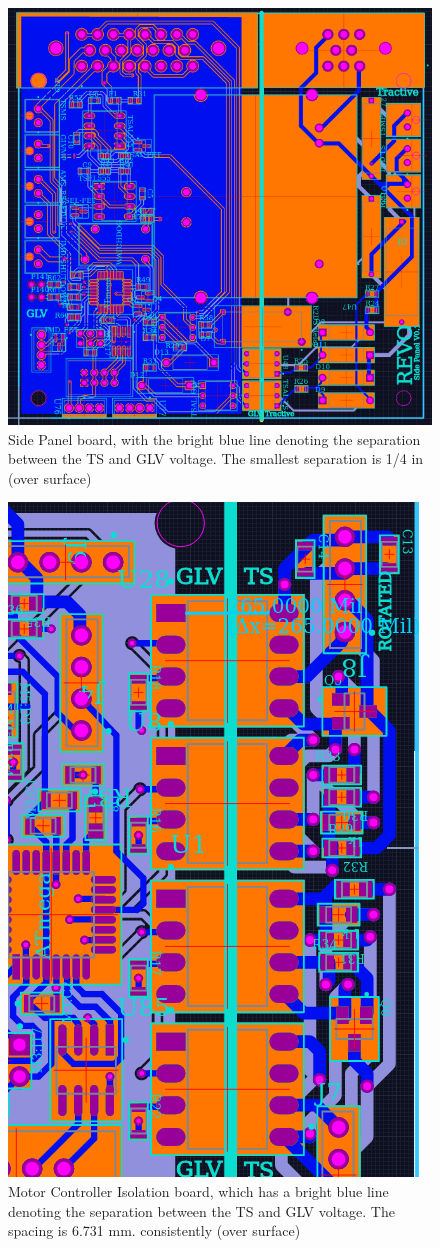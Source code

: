 \documentclass{article}
\begin{document}
\begin{figure}[H]
    \centering
    \includegraphics[width = 0.7 \textwidth]{sidepanelPCB}
    \caption{Side Panel board, with the bright blue line denoting the separation between the TS and GLV voltage. The smallest separation is 1/4 in (over surface)}
    \label{sidepanelspacing}
\end{figure}

\begin{figure}[H]
    \centering
    \includegraphics[width = 0.6 \textwidth]{MCCspacing}
    \caption{Motor Controller Isolation board, which has a bright blue line denoting the separation between the TS and GLV voltage. The spacing is 6.731 mm. consistently (over surface)}
    \label{MCCspacing}
\end{figure}
\end{document}
